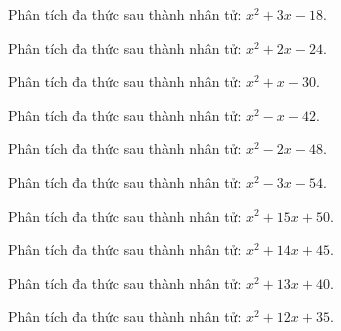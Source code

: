 \begin{bt}
	Phân tích đa thức sau thành nhân tử: $x^2 + 3 x - 18$.
\end{bt}
\begin{bt}
	Phân tích đa thức sau thành nhân tử: $x^2 + 2 x - 24$.
\end{bt}
\begin{bt}
	Phân tích đa thức sau thành nhân tử: $x^2 + x - 30$.
\end{bt}
\begin{bt}
	Phân tích đa thức sau thành nhân tử: $x^2 - x - 42$.
\end{bt}
\begin{bt}
	Phân tích đa thức sau thành nhân tử: $x^2 - 2 x - 48$.
\end{bt}
\begin{bt}
	Phân tích đa thức sau thành nhân tử: $x^2 - 3 x - 54$.
\end{bt}
\begin{bt}
	Phân tích đa thức sau thành nhân tử: $x^2 + 15 x + 50$.
\end{bt}
\begin{bt}
	Phân tích đa thức sau thành nhân tử: $x^2 + 14 x + 45$.
\end{bt}
\begin{bt}
	Phân tích đa thức sau thành nhân tử: $x^2 + 13 x + 40$.
\end{bt}
\begin{bt}
	Phân tích đa thức sau thành nhân tử: $x^2 + 12 x + 35$.
\end{bt}
